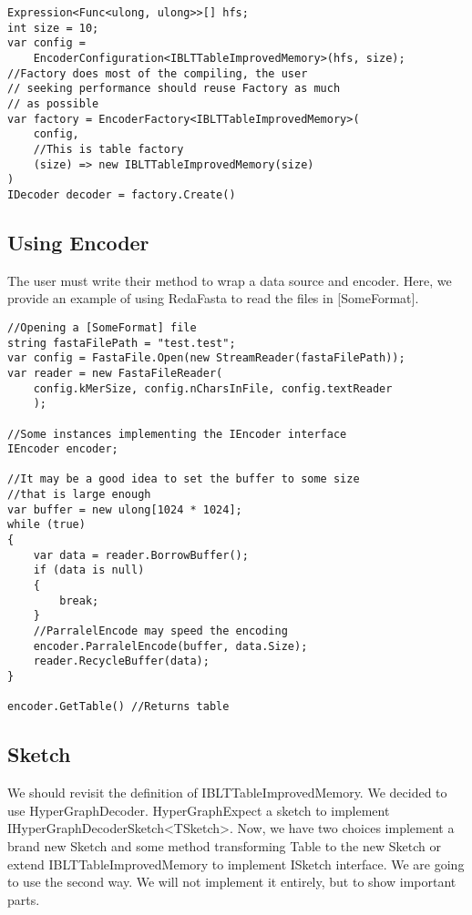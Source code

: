 \begin{lstlisting}
Expression<Func<ulong, ulong>>[] hfs;
int size = 10;
var config = 
    EncoderConfiguration<IBLTTableImprovedMemory>(hfs, size);
//Factory does most of the compiling, the user
// seeking performance should reuse Factory as much
// as possible
var factory = EncoderFactory<IBLTTableImprovedMemory>(
    config, 
    //This is table factory
    (size) => new IBLTTableImprovedMemory(size)
)
IDecoder decoder = factory.Create()
\end{lstlisting}

\subsection{Using Encoder}
The user must write their method to wrap a data source and encoder. Here, we provide an example of using RedaFasta to read the files in [SomeFormat]. 
\begin{lstlisting}
//Opening a [SomeFormat] file
string fastaFilePath = "test.test";
var config = FastaFile.Open(new StreamReader(fastaFilePath));
var reader = new FastaFileReader(
    config.kMerSize, config.nCharsInFile, config.textReader
    );

//Some instances implementing the IEncoder interface
IEncoder encoder;

//It may be a good idea to set the buffer to some size 
//that is large enough
var buffer = new ulong[1024 * 1024];
while (true)
{
    var data = reader.BorrowBuffer();
    if (data is null)
    {
        break;
    }
    //ParralelEncode may speed the encoding
    encoder.ParralelEncode(buffer, data.Size);
    reader.RecycleBuffer(data);
}

encoder.GetTable() //Returns table
\end{lstlisting}

\subsection{Sketch}
We should revisit the definition of IBLTTableImprovedMemory. We decided to use HyperGraphDecoder. HyperGraphExpect a sketch to implement IHyperGraphDecoderSketch<TSketch>. Now, we have two choices implement a brand new Sketch and some method transforming Table to the new Sketch or extend IBLTTableImprovedMemory to implement ISketch interface. We are going to use the second way. We will not implement it entirely, but to show important parts. 

